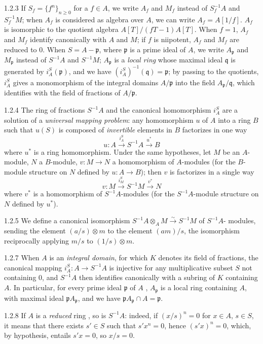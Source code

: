 \begin{env}{1.2.3}
If $S_f=\{f^n\}_{n\geq 0}$ for a $f\in A$, we write $A_f$ and $M_f$ instead of $S_f^{-1}A$ and $S_f^{-1}M$; when $A_f$ is
considered as algebra over $A$, we can write $A_f=A[1/f]$. $A_f$ is isomorphic to the quotient algebra $A[T]/(fT-1)A[T]$.
When $f=1$, $A_f$ and $M_f$ identify canonically with $A$ and $M$; if $f$ is niipotent, $A_f$ and $M_f$ are reduced to $0$.
When $S=A-\mathfrak{p}$, where $\mathfrak{p}$ is a prime ideal of $A$, we write $A_\mathfrak{p}$ and $M_\mathfrak{p}$ instead of $S^{-1}A$ and $S^{-1}M$;
$A_\mathfrak{p}$ is a \emph{local ring} whose maximal ideal $\mathfrak{q}$ is generated by $i_A^S(\mathfrak{p})$, and we have
$(i_A^S)^{-1}(\mathfrak{q})=\mathfrak{p}$; by passing to the quotients, $i_A^S$ gives a monomorphism of the integral domains $A/\mathfrak{p}$ into the
field $A_\mathfrak{p}/\mathfrak{q}$, which identifies with the field of fractions of $A/\mathfrak{p}$.
\end{env}

\begin{env}{1.2.4}
The ring of fractions $S^{-1}A$ and the canonical homomorphism $i_A^S$ are a solution of a \emph{universal mapping problem}:
any homomorphism $u$ of $A$ into a ring $B$ such that $u(S)$ is composed of \emph{invertible} elements in $B$ factorizes in
one way
\[
  u\colon A\xrightarrow{i_A^S}S^{-1}A\xrightarrow{u^\ast}B
\]
where $u^\ast$ is a ring homomorphism. Under the same hypotheses, let $M$ be an
$A$-module, $N$ a $B$-module, $v\colon M\to N$ a homomorphism of $A$-modules (for the
$B$-module structure on $N$ defined by $u\colon A\to B$); then $v$ is factorizes in a single
way
\[
  v\colon M\xrightarrow{i_M^S}S^{-1}M\xrightarrow{v^\ast}N
\]
where $v^\ast$ is a homomorphism of $S^{-1}A$-modules (for the $S^{-1}A$-module structure 
on $N$ defined by $u^\ast$).
\end{env}

\begin{env}{1.2.5}
We define a canonical isomorphism $S^{-1}A\otimes_A M\xrightarrow{\sim}S^{-1}M$ of $S^{-1}A$-
modules, sending the element $(a/s)\otimes m$ to the element $(am)/s$, the isomorphism
reciprocally applying $m/s$ to $(1/s)\otimes m$.
\end{env}

\begin{env}{1.2.7}
When $A$ is an \emph{integral domain}, for which $K$ denotes its field of fractions, the canonical mapping $i_A^S\colon A\to S^{-1}A$
is injective for any multiplicative subset $S$ not containing $0$, and $S^{-1}A$ then identifies canonically with a subring of $K$
containing $A$. In particular, for every prime ideal $\mathfrak{p}$ of $A$ , $A_\mathfrak{p}$ is a local ring containing $A$,
with maximal ideal $\mathfrak{p}A_\mathfrak{p}$, and we have $\mathfrak{p}A_\mathfrak{p}\cap A=\mathfrak{p}$.
\end{env}

\begin{env}{1.2.8}
If $A$ is a \emph{reduced} ring , so is $S^{-1}A$: indeed, if $(x/s)^n=0$ for $x\in A$, $s\in S$, it means that
there exists $s'\in S$ such that $s'x^n=0$, hence $(s'x)^n=0$, which, by hypothesis, entails $s'x=0$, so $x/s=0$.
\end{env}

